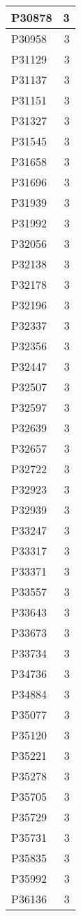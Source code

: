 \documentclass[
]{book}
\theoremstyle{definition}
\theoremstyle{definition}
\theoremstyle{definition}
\theoremstyle{definition}
\theoremstyle{remark}
\begin{document}
\begin{table}
\begin{tabular}{l|r}
\hline
P30878 & 3\\
\hline
P30958 & 3\\
\hline
P31129 & 3\\
\hline
P31137 & 3\\
\hline
P31151 & 3\\
\hline
P31327 & 3\\
\hline
P31545 & 3\\
\hline
P31658 & 3\\
\hline
P31696 & 3\\
\hline
P31939 & 3\\
\hline
P31992 & 3\\
\hline
P32056 & 3\\
\hline
P32138 & 3\\
\hline
P32178 & 3\\
\hline
P32196 & 3\\
\hline
P32337 & 3\\
\hline
P32356 & 3\\
\hline
P32447 & 3\\
\hline
P32507 & 3\\
\hline
P32597 & 3\\
\hline
P32639 & 3\\
\hline
P32657 & 3\\
\hline
P32722 & 3\\
\hline
P32923 & 3\\
\hline
P32939 & 3\\
\hline
P33247 & 3\\
\hline
P33317 & 3\\
\hline
P33371 & 3\\
\hline
P33557 & 3\\
\hline
P33643 & 3\\
\hline
P33673 & 3\\
\hline
P33734 & 3\\
\hline
P34736 & 3\\
\hline
P34884 & 3\\
\hline
P35077 & 3\\
\hline
P35120 & 3\\
\hline
P35221 & 3\\
\hline
P35278 & 3\\
\hline
P35705 & 3\\
\hline
P35729 & 3\\
\hline
P35731 & 3\\
\hline
P35835 & 3\\
\hline
P35992 & 3\\
\hline
P36136 & 3\\

\end{tabular}
\end{table}
\end{document}
